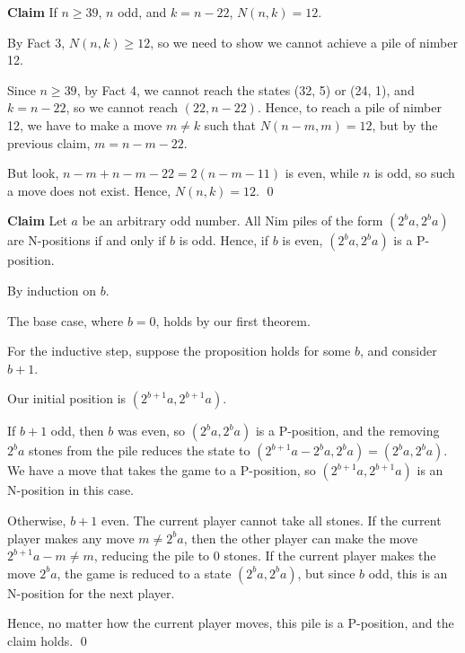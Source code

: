 \documentclass[12pt]{amsart}
\newcommand{\claim}{{\bf Claim }}
\begin{document}
\claim If $n \geq 39$, $n$ odd, and $k = n - 22$, $N(n, k) = 12$.

\proof By Fact 3, $N(n, k) \geq 12$, so we need to show we cannot achieve a pile of nimber 12. 

Since $n \geq 39$, by Fact 4, we cannot reach the states (32, 5) or (24, 1), and $k = n - 22$, so we cannot reach $(22, n - 22)$. Hence, to reach a pile of nimber 12, we have to make a move $m \neq k$ such that $N(n - m, m) = 12$, but by the previous claim, $m = n - m - 22$. 

But look, $n - m + n - m - 22 = 2(n - m - 11)$ is even, while $n$ is odd, so such a move does not exist. Hence, $N(n, k) = 12$. \qed

\claim Let $a$ be an arbitrary odd number. All Nim piles of the form $(2^ba, 2^ba)$ are N-positions if and only if $b$ is odd. Hence, if $b$ is even, $(2^ba, 2^ba)$ is a P-position.

\proof By induction on $b$.

The base case, where $b = 0$, holds by our first theorem. 

For the inductive step, suppose the proposition holds for some $b$, and consider $b + 1$.

Our initial position is $(2^{b+1}a, 2^{b+1}a)$.

If $b + 1$ odd, then $b$ was even, so $(2^ba, 2^ba)$ is a P-position, and the removing $2^ba$ stones from the pile reduces the state to $(2^{b+1}a - 2^ba, 2^ba) = (2^ba, 2^ba)$. We have a move that takes the game to a P-position, so $(2^{b+1}a, 2^{b+1}a)$ is an N-position in this case.

Otherwise, $b + 1$ even. The current player cannot take all stones. If the current player makes any move $m \neq 2^ba$, then the other player can make the move $2^{b+1}a - m \neq m$, reducing the pile to $0$ stones. If the current player makes the move $2^ba$, the game is reduced to a state $(2^ba, 2^ba)$, but since $b$ odd, this is an N-position for the next player.

Hence, no matter how the current player moves, this pile is a P-position, and the claim holds. \qed
\end{document}
